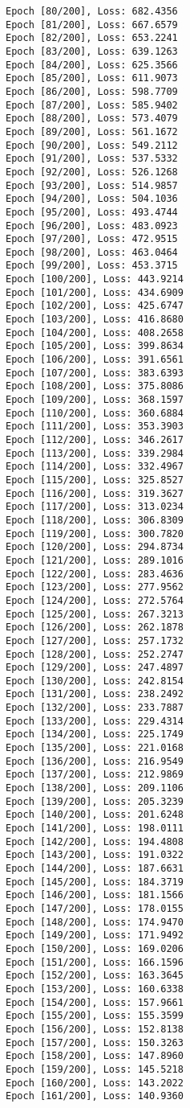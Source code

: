 \documentclass[11pt]{article}
\begin{document}
\begin{Verbatim}[commandchars=\\\{\}]
Epoch [80/200], Loss: 682.4356
Epoch [81/200], Loss: 667.6579
Epoch [82/200], Loss: 653.2241
Epoch [83/200], Loss: 639.1263
Epoch [84/200], Loss: 625.3566
Epoch [85/200], Loss: 611.9073
Epoch [86/200], Loss: 598.7709
Epoch [87/200], Loss: 585.9402
Epoch [88/200], Loss: 573.4079
Epoch [89/200], Loss: 561.1672
Epoch [90/200], Loss: 549.2112
Epoch [91/200], Loss: 537.5332
Epoch [92/200], Loss: 526.1268
Epoch [93/200], Loss: 514.9857
Epoch [94/200], Loss: 504.1036
Epoch [95/200], Loss: 493.4744
Epoch [96/200], Loss: 483.0923
Epoch [97/200], Loss: 472.9515
Epoch [98/200], Loss: 463.0464
Epoch [99/200], Loss: 453.3715
Epoch [100/200], Loss: 443.9214
Epoch [101/200], Loss: 434.6909
Epoch [102/200], Loss: 425.6747
Epoch [103/200], Loss: 416.8680
Epoch [104/200], Loss: 408.2658
Epoch [105/200], Loss: 399.8634
Epoch [106/200], Loss: 391.6561
Epoch [107/200], Loss: 383.6393
Epoch [108/200], Loss: 375.8086
Epoch [109/200], Loss: 368.1597
Epoch [110/200], Loss: 360.6884
Epoch [111/200], Loss: 353.3903
Epoch [112/200], Loss: 346.2617
Epoch [113/200], Loss: 339.2984
Epoch [114/200], Loss: 332.4967
Epoch [115/200], Loss: 325.8527
Epoch [116/200], Loss: 319.3627
Epoch [117/200], Loss: 313.0234
Epoch [118/200], Loss: 306.8309
Epoch [119/200], Loss: 300.7820
Epoch [120/200], Loss: 294.8734
Epoch [121/200], Loss: 289.1016
Epoch [122/200], Loss: 283.4636
Epoch [123/200], Loss: 277.9562
Epoch [124/200], Loss: 272.5764
Epoch [125/200], Loss: 267.3213
Epoch [126/200], Loss: 262.1878
Epoch [127/200], Loss: 257.1732
Epoch [128/200], Loss: 252.2747
Epoch [129/200], Loss: 247.4897
Epoch [130/200], Loss: 242.8154
Epoch [131/200], Loss: 238.2492
Epoch [132/200], Loss: 233.7887
Epoch [133/200], Loss: 229.4314
Epoch [134/200], Loss: 225.1749
Epoch [135/200], Loss: 221.0168
Epoch [136/200], Loss: 216.9549
Epoch [137/200], Loss: 212.9869
Epoch [138/200], Loss: 209.1106
Epoch [139/200], Loss: 205.3239
Epoch [140/200], Loss: 201.6248
Epoch [141/200], Loss: 198.0111
Epoch [142/200], Loss: 194.4808
Epoch [143/200], Loss: 191.0322
Epoch [144/200], Loss: 187.6631
Epoch [145/200], Loss: 184.3719
Epoch [146/200], Loss: 181.1566
Epoch [147/200], Loss: 178.0155
Epoch [148/200], Loss: 174.9470
Epoch [149/200], Loss: 171.9492
Epoch [150/200], Loss: 169.0206
Epoch [151/200], Loss: 166.1596
Epoch [152/200], Loss: 163.3645
Epoch [153/200], Loss: 160.6338
Epoch [154/200], Loss: 157.9661
Epoch [155/200], Loss: 155.3599
Epoch [156/200], Loss: 152.8138
Epoch [157/200], Loss: 150.3263
Epoch [158/200], Loss: 147.8960
Epoch [159/200], Loss: 145.5218
Epoch [160/200], Loss: 143.2022
Epoch [161/200], Loss: 140.9360

\end{Verbatim}
\end{document}
